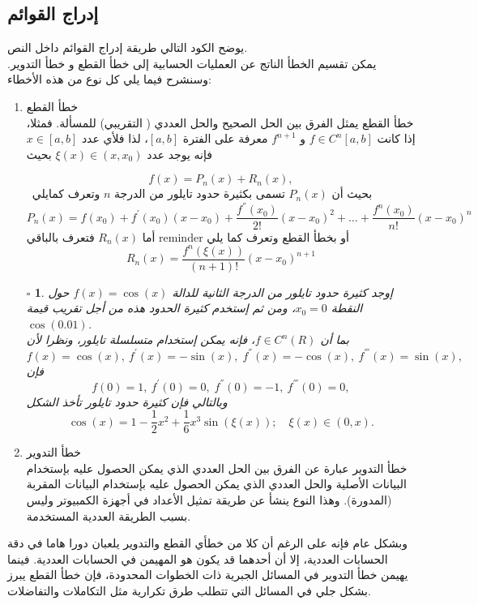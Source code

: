 \documentclass[a4 paper]{report}
\theoremstyle{mystyle}
\newtheorem{example}{$\square$ \arabicfonttt{\underline{مثال}}}[chapter]
\theoremstyle{Excercises}
\newcommand{\eng}{\textenglish}  %
\begin{document}
\subsection{إدراج القوائم}
يوضح الكود التالي طريقة إدراج القوائم داخل النص. \\
يمكن تقسيم الخطأ الناتج عن العمليات الحسابية إلى خطأ القطع و خطأ التدوير. وسنشرح فيما يلي كل نوع من هذه الأخطاء:
\begin{enumerate}
\item{خطأ القطع}\\
خطأ القطع يمثل الفرق بين الحل الصحيح والحل العددي ( التقريبي) للمسألة. فمثلا، إذا كانت $f \in C^{n} [a,b] $ و $f^{n+1}$ معرفة على الفترة $[a,b]$، لذا فلأي عدد  $x \in [a,b]$  فإنه يوجد عدد $\xi(x) \in (x ,x_0)$ بحيث

\begin{equation}
f(x) = P_n(x) + R_n(x),
\end{equation}
\
بحيث أن $P_n(x)$ تسمى بكثيرة حدود تايلور من الدرجة $n$  وتعرف كمايلي
\[ P_n(x) = f(x_0)+f^{'}(x_0) ( x-x_0) + \frac{f^{''}(x_0)}{2!}( x-x_0)^2+\hdots+\frac{f^{n}(x_0)}{n!}( x-x_0)^n\]
أما $R_n (x)$ فتعرف بالباقي \eng{reminder} أو بخطأ القطع وتعرف كما يلي
\[ R_n (x) = \frac{f^{n}(\xi(x))}{(n+1)!}( x-x_0)^{n+1}\]

\begin{example}\label{eg:basics:trunc.error}
إوجد كثيرة حدود تايلور من الدرجة الثانية للدالة $f(x) = \cos(x)$ حول النقطة $x_0 = 0$، ومن ثم إستخدم كثيرة الحدود هذه من أجل تقريب قيمة $\cos(0.01)$.\\
 بما أن  $f \in C^{n} (R)$، فإنه يمكن إستخدام متسلسلة تايلور، ونظرا لأن
 \[ f(x) = \cos(x),\:  f^{'} (x) = -\sin(x), \; f^{''}(x) = -\cos(x), \: f^{'''}(x) = \sin(x),\]
 فإن
 \[ f(0) = 1,\:  f^{'} (0) = 0, \; f^{''}(0) = -1, \: f^{'''}(0) = 0,\]
 وبالتالي فإن كثيرة حدود تايلور تأخذ الشكل
 \[ \cos(x) = 1 - \frac{1}{2} x^2 + \frac{1}{6} x^3 \sin(\xi(x)); \quad \xi(x) \in (0,x). \]
\end{example}

\item{خطأ التدوير}\\
خطأ التدوير عبارة عن الفرق بين الحل العددي الذي يمكن الحصول عليه بإستخدام البيانات الأصلية والحل العددي الذي يمكن الحصول عليه بإستخدام البيانات المقربة (المدورة). وهذا النوع ينشأ عن طريقة تمثيل الأعداد في أجهزة الكمبيوتر وليس بسبب الطريقة العددية المستخدمة.
\end{enumerate}

وبشكل عام فإنه على الرغم أن كلا من خطأي القطع والتدوير يلعبان دورا هاما في دقة الحسابات العددية، إلا أن أحدهما قد يكون هو المهيمن في الحسابات العددية. فينما يهيمن خطأ التدوير في المسائل الجبرية ذات الخطوات المحدودة، فإن خطأ القطع يبرز بشكل جلي في المسائل التي تتطلب طرق تكرارية مثل التكاملات والتفاضلات.
\end{document}
